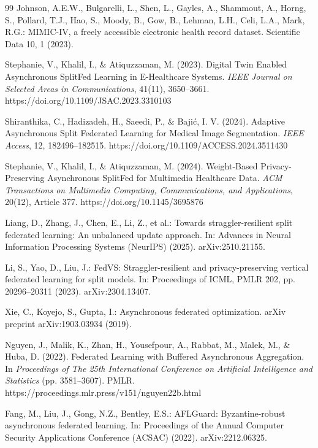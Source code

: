 \documentclass[pdflatex,sn-mathphys-num]{sn-jnl}
\begin{document}
\begin{thebibliography}{99}
Johnson, A.E.W., Bulgarelli, L., Shen, L., Gayles, A., Shammout, A., Horng, S., Pollard, T.J., Hao, S., Moody, B., Gow, B., Lehman, L.H., Celi, L.A., Mark, R.G.: MIMIC-IV, a freely accessible electronic health record dataset. Scientific Data 10, 1 (2023).


Stephanie, V., Khalil, I., \& Atiquzzaman, M. (2023). Digital Twin Enabled Asynchronous SplitFed Learning in E-Healthcare Systems. \textit{IEEE Journal on Selected Areas in Communications}, 41(11), 3650--3661. https://doi.org/10.1109/JSAC.2023.3310103

Shiranthika, C., Hadizadeh, H., Saeedi, P., \& Bajić, I. V. (2024). Adaptive Asynchronous Split Federated Learning for Medical Image Segmentation. \textit{IEEE Access}, 12, 182496--182515. https://doi.org/10.1109/ACCESS.2024.3511430

Stephanie, V., Khalil, I., \& Atiquzzaman, M. (2024). Weight-Based Privacy-Preserving Asynchronous SplitFed for Multimedia Healthcare Data. \textit{ACM Transactions on Multimedia Computing, Communications, and Applications}, 20(12), Article 377. https://doi.org/10.1145/3695876

Liang, D., Zhang, J., Chen, E., Li, Z., et al.: Towards straggler-resilient split federated learning: An unbalanced update approach. In: Advances in Neural Information Processing Systems (NeurIPS) (2025). arXiv:2510.21155.

Li, S., Yao, D., Liu, J.: FedVS: Straggler-resilient and privacy-preserving vertical federated learning for split models. In: Proceedings of ICML, PMLR 202, pp. 20296--20311 (2023). arXiv:2304.13407.

Xie, C., Koyejo, S., Gupta, I.: Asynchronous federated optimization. arXiv preprint arXiv:1903.03934 (2019).

Nguyen, J., Malik, K., Zhan, H., Yousefpour, A., Rabbat, M., Malek, M., \& Huba, D. (2022). Federated Learning with Buffered Asynchronous Aggregation. In \textit{Proceedings of The 25th International Conference on Artificial Intelligence and Statistics} (pp. 3581--3607). PMLR. https://proceedings.mlr.press/v151/nguyen22b.html

Fang, M., Liu, J., Gong, N.Z., Bentley, E.S.: AFLGuard: Byzantine-robust asynchronous federated learning. In: Proceedings of the Annual Computer Security Applications Conference (ACSAC) (2022). arXiv:2212.06325.


\end{thebibliography}
\end{document}
